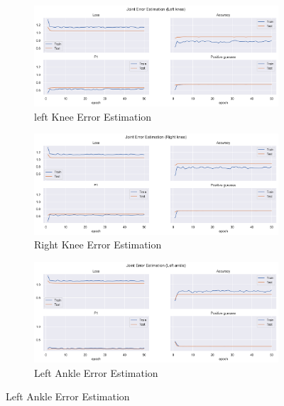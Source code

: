 \begin{figure}[!ht]
  \centering
  \begin{subfigure}[b]{0.47\linewidth}
      \centering
      \includegraphics[width=\textwidth]{figures/Results/v1/jt/Left knee_ErrorEstimation.png}
      \caption{left Knee Error Estimation}
      \label{fig:v1_lekn_jt_ee}
  \end{subfigure}
  \hfill
  \begin{subfigure}[b]{0.47\linewidth}
      \centering
      \includegraphics[width=\textwidth]{figures/Results/v1/jt/Right knee_ErrorEstimation.png}
      \caption{Right Knee Error Estimation}
      \label{fig:v1_rikn_jt_ee}
  \end{subfigure}
  \hfill
  \begin{subfigure}[b]{0.47\linewidth}
      \centering
      \includegraphics[width=\textwidth]{figures/Results/v1/jt/Left ankle_ErrorEstimation.png}
      \caption{Left Ankle Error Estimation}

\end{subfigure}
\end{figure}
